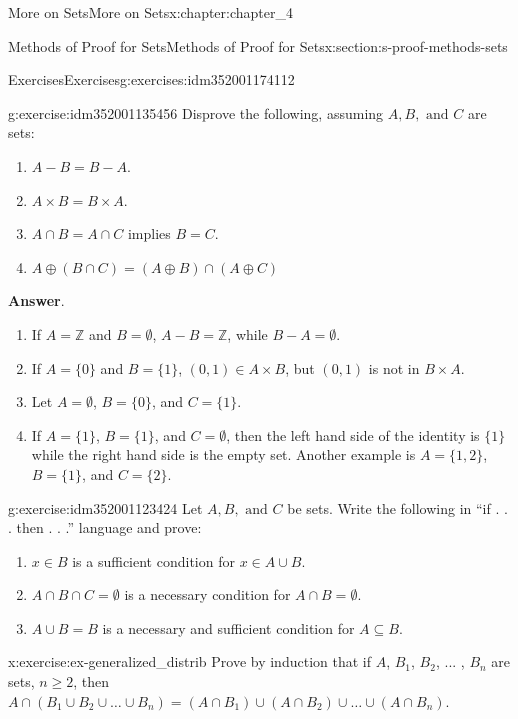 \documentclass[oneside,10pt,]{book}
\newcommand{\blocktitlefont}{\relax}
\begin{document}
\begin{chapterptx}{More on Sets}{}{More on Sets}{}{}{x:chapter:chapter_4}
\begin{sectionptx}{Methods of Proof for Sets}{}{Methods of Proof for Sets}{}{}{x:section:s-proof-methods-sets}
\begin{exercises-subsection}{Exercises}{}{Exercises}{}{}{g:exercises:idm352001174112}
\begin{divisionexercise}{3}{}{}{g:exercise:idm352001135456}
Disprove the following, assuming \(A, B, \textrm{ and } C\) are sets:%
\begin{enumerate}[label=(\alph*)]
\item{}\(A - B = B - A\).%
\item{}\(A\times B = B\times A\).%
\item{}\(A \cap   B = A  \cap   C\) implies \(B = C\).%
\item{}\(\displaystyle A \oplus  (B\cap C) = (A \oplus  B)\cap  (A \oplus C)\)%
\end{enumerate}
%
\par\smallskip%
\noindent\textbf{\blocktitlefont Answer}.\hypertarget{g:answer:idm352001265552}{}\quad{}%
\begin{enumerate}[label=(\alph*)]
\item{}If \(A = \mathbb{Z}\) and \(B=\emptyset\), \(A - B = \pmb{\mathbb{Z}}\), while \(B - A = \emptyset\).%
\item{}If \(A=\{0\}\) and \(B = \{1\}\), \((0,1) \in  A \times  B\), but \((0, 1)\) is not in \(B\times A\).%
\item{}Let \(A = \emptyset\), \(B = \{0\}\), and \(C = \{1\}\).%
\item{}If \(A = \{1\}\), \(B = \{1\}\), and \(C =\emptyset\), then the left hand side of the identity is \(\{1\}\) while the right hand side is the empty set. Another example is \(A = \{1,2\}\), \(B = \{1\}\), and \(C =\{2\}.\)%
\end{enumerate}
%
\end{divisionexercise}%
\begin{divisionexercise}{4}{}{}{g:exercise:idm352001123424}%
Let \(A, B, \textrm{ and } C\) be sets. Write the following in ``if . . . then . . .'' language and prove:%
\begin{enumerate}[label=(\alph*)]
\item{}\(x \in  B\) is a sufficient condition for \(x \in  A \cup B\).%
\item{}\(A \cap B\cap C = \emptyset\) is a necessary condition for \(A \cap  B =\emptyset\).%
\item{}\(A \cup  B = B\) is a necessary and sufficient condition for \(A\subseteq  B\).%
\end{enumerate}
%
\end{divisionexercise}%
\begin{divisionexercise}{5}{}{}{x:exercise:ex-generalized_distrib}%
Prove by induction that if \(A\), \(B_1\), \(B_2\), ... , \(B_n\) are sets, \(n\geq 2\), then \(A\cap ( B_1 \cup  B_2\cup  \dots  \cup  B_n) = (A \cap B_1) \cup  (A \cap B_2 ) \cup  \dots \cup  (A\cap B_n)\).%

\end{divisionexercise}
\end{exercises-subsection}
\end{sectionptx}
\end{chapterptx}
\end{document}
